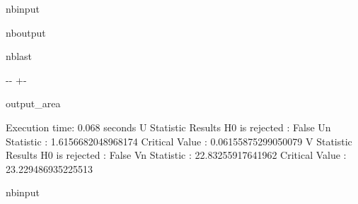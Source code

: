 \documentclass[letterpaper,10pt,english,openany,oneside]{sphinxmanual}
\begin{document}
\begin{sphinxuseclass}{nbinput}
{\begin{sphinxVerbatim}[commandchars=\\\{\}]
\end{sphinxVerbatim}
}

\end{sphinxuseclass}
\begin{sphinxuseclass}{nboutput}
\begin{sphinxuseclass}{nblast}
{

\kern-\sphinxverbatimsmallskipamount\kern-\baselineskip
\kern+\FrameHeightAdjust\kern-\fboxrule
\vspace{\nbsphinxcodecellspacing}

\begin{sphinxuseclass}{output_area}
\begin{sphinxuseclass}{}


\begin{sphinxVerbatim}[commandchars=\\\{\}]
Execution time: 0.068 seconds
U Statistic Results
H0 is rejected : False
Un Statistic : 1.6156682048968174
Critical Value : 0.06155875299050079
V Statistic Results
H0 is rejected : False
Vn Statistic : 22.83255917641962
Critical Value : 23.229486935225513
\end{sphinxVerbatim}



\end{sphinxuseclass}
\end{sphinxuseclass}
}

\end{sphinxuseclass}
\end{sphinxuseclass}
\begin{sphinxuseclass}{nbinput}
{
\begin{sphinxVerbatim}[commandchars=\\\{\}]
\llap{\color{nbsphinxin}[12]:\,\hspace{\fboxrule}\hspace{\fboxsep}}
\end{sphinxVerbatim}
}

\end{sphinxuseclass}
\end{document}
